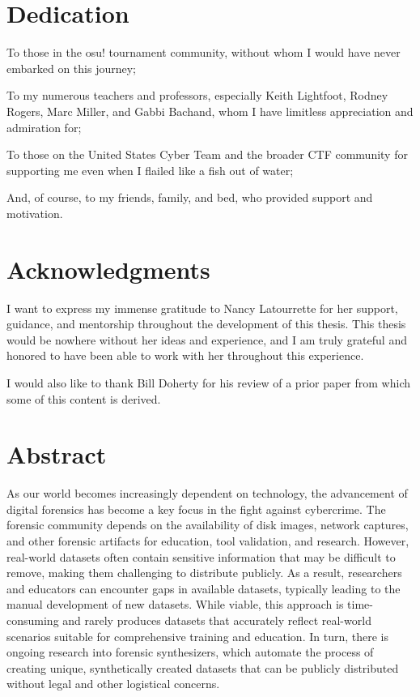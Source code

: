 \section{Dedication}\label{dedication}

To those in the osu! tournament community, without whom I would have
never embarked on this journey;

To my numerous teachers and professors, especially Keith Lightfoot,
Rodney Rogers, Marc Miller, and Gabbi Bachand, whom I have limitless
appreciation and admiration for;

To those on the United States Cyber Team and the broader CTF community
for supporting me even when I flailed like a fish out of water;

And, of course, to my friends, family, and bed, who provided support and
motivation.

\section{Acknowledgments}\label{acknowledgments}

I want to express my immense gratitude to Nancy Latourrette for her
support, guidance, and mentorship throughout the development of this
thesis. This thesis would be nowhere without her ideas and experience,
and I am truly grateful and honored to have been able to work with her
throughout this experience.

I would also like to thank Bill Doherty for his review of a prior paper
from which some of this content is derived.

\section{Abstract}\label{abstract}

As our world becomes increasingly dependent on technology, the
advancement of digital forensics has become a key focus in the fight
against cybercrime. The forensic community depends on the availability
of disk images, network captures, and other forensic artifacts for
education, tool validation, and research. However, real-world datasets
often contain sensitive information that may be difficult to remove,
making them challenging to distribute publicly. As a result, researchers
and educators can encounter gaps in available datasets, typically
leading to the manual development of new datasets. While viable, this
approach is time-consuming and rarely produces datasets that accurately
reflect real-world scenarios suitable for comprehensive training and
education. In turn, there is ongoing research into forensic
synthesizers, which automate the process of creating unique,
synthetically created datasets that can be publicly distributed without
legal and other logistical concerns.

